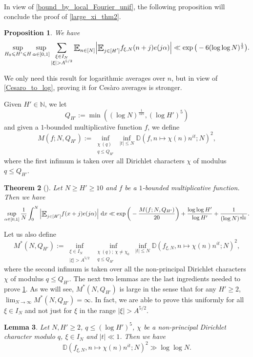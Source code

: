 \documentclass[letter,11pt]{article}
\theoremstyle{plain} %
\newtheorem{theorem}{Theorem}[section]
\newtheorem{proposition}[theorem]{Proposition}
\newtheorem{lemma}[theorem]{Lemma}
\theoremstyle{definition} %
\theoremstyle{plain}
\theoremstyle{plain}
\theoremstyle{plain}
\numberwithin{equation}{section}
\newcommand{\Cesaro}{Ces\`{a}ro}
\newcommand{\N}{\mathbb{N}}
\renewcommand{\leq}{\leqslant}
\renewcommand{\geq}{\geqslant}
\renewcommand{\d}{~\mathrm{d}}
\newcommand{\Esub}[1]{\raisebox{-0.4ex}{\scalebox{1.4}[1.3]{$\mathbb{E}$}}\raisebox{-0.35ex}{\ensuremath{_{\scriptstyle #1}}}}
\newcommand{\Dist}{\mathbb{D}}
\newcommand{\1}{\mathbbm{1}}
\newcommand{\f}{f_{\xi,N}}
\begin{document}
In view of \cref{bound_by_local_Fourier_unif}, the following proposition will conclude the proof of \cref{large_xi_thm2}.

\begin{proposition}\label{F_unif_thm}
    We have
    $$\sup_{H_0\leq H'\leq H}\sup_{\alpha\in[0,1]}\sum_{\substack{\xi\in I_N \\ |\xi|>A^{5/2}}}\Esub{n\in[N]}\Big|\Esub{j\in[H']}\f(n+j)e(j\alpha)\Big|
    \ll \exp\big(-6(\log\log{N})^\frac{1}{3}\big).$$
\end{proposition}

We only need this result for logarithmic averages over $n$, but in view of \cref{Cesaro_to_log}, proving it for \Cesaro{} averages is stronger.

Given $H'\in\N$, we let 
$$Q_{H'} := \min((\log{N})^\frac{1}{125},(\log{H'})^5)$$
and given a $1$-bounded multiplicative function $f$, we define
$$M(f;N,Q_{H'}) := \inf_{\substack{\chi\:(q) \\ q\leq Q_{H'}}}\inf_{|t|\leq N}
\Dist(f, n\mapsto \chi(n)n^{it};N)^2,$$
where the first infimum is taken over all Dirichlet characters $\chi$ of modulus $q\leq Q_{H'}$.

\begin{theorem}[{\cite[Theorem 1.7]{MRT15}}]\label{MRT_thm}
Let $N\geq H'\geq 10$ and $f$ be a $1$-bounded multiplicative function. Then we have
$$
    \sup_{\alpha\in[0,1]}\frac{1}{N}\int_0^N \Big|\Esub{j\in[H']} f(x+j)e(j\alpha)\Big| \d x
    \ll \exp\bigg(-\frac{M(f;N,Q_{H'})}{20}\bigg) + \frac{\log\log{H'}}{\log{H'}} + \frac{1}{(\log{N})^\frac{1}{700}}.
$$
\end{theorem}

Let us also define
$$M^\ast(N,Q_{H'})
:= \inf_{\substack{\xi\in I_N \\ |\xi|>A^{5/2}}}\inf_{\substack{\chi\:(q); \: \chi\neq\chi_0 \\ q\leq Q_{H'}}}\inf_{|t|\leq N}
\Dist(\f, n\mapsto \chi(n)n^{it};N)^2,$$
where the second infimum is taken over all the non-principal Dirichlet characters $\chi$ of
modulus $q\leq Q_{H'}$.
The next two lemmas are the last ingredients needed to prove \cref{F_unif_thm}. As we will see, $M^\ast(N,Q_{H'})$ is large in the sense that for any $H'\geq2$, $\lim_{N\to\infty}M^\ast(N,Q_{H'}) = \infty$. In fact, we are able to prove this uniformly for all $\xi\in I_N$ and not just for $\xi$ in the range $|\xi|>A^{5/2}$.

\begin{lemma}\label{dist1 with chi}
Let $N,H'\geq 2$, $q\leq(\log{H'})^5$, $\chi$ be a non-principal Dirichlet character modulo $q$, 
$\xi\in I_N$ and $|t|\ll1$. Then we have
$$\Dist(\f,n\mapsto \chi(n)n^{it};N)^2 \gg \log\log{N}.$$
\end{lemma}
\end{document}
